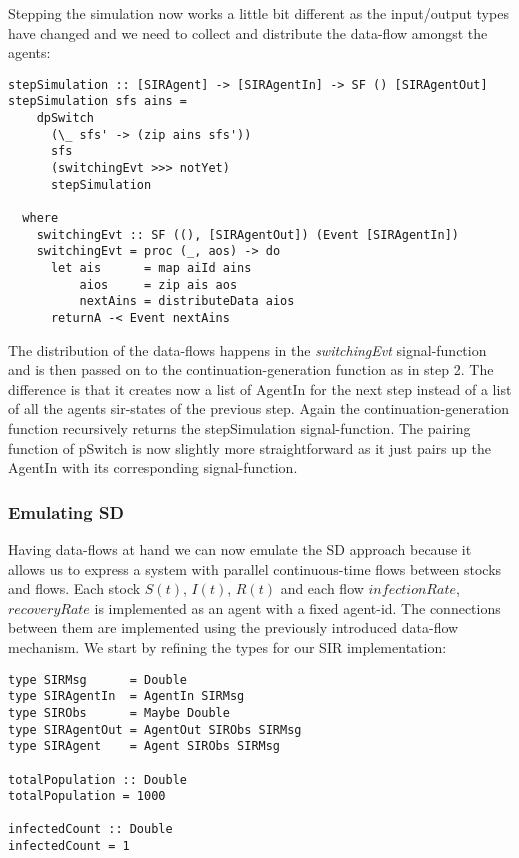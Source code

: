Stepping the simulation now works a little bit different as the input/output types have changed and we need to collect and distribute the data-flow amongst the agents:

\begin{verbatim}
stepSimulation :: [SIRAgent] -> [SIRAgentIn] -> SF () [SIRAgentOut]
stepSimulation sfs ains =
    dpSwitch
      (\_ sfs' -> (zip ains sfs'))
      sfs
      (switchingEvt >>> notYet)
      stepSimulation

  where
    switchingEvt :: SF ((), [SIRAgentOut]) (Event [SIRAgentIn])
    switchingEvt = proc (_, aos) -> do
      let ais      = map aiId ains
          aios     = zip ais aos
          nextAins = distributeData aios
      returnA -< Event nextAins
\end{verbatim}

The distribution of the data-flows happens in the \textit{switchingEvt} signal-function and is then passed on to the continuation-generation function as in step 2. The difference is that it creates now a list of AgentIn for the next step instead of a list of all the agents sir-states of the previous step. Again the continuation-generation function recursively returns the stepSimulation signal-function. The pairing function of pSwitch is now slightly more straightforward as it just pairs up the AgentIn with its corresponding signal-function.

\subsubsection{Emulating SD}
Having data-flows at hand we can now emulate the SD approach because it allows us to express a system with parallel continuous-time flows between stocks and flows. Each stock $S(t)$, $I(t)$, $R(t)$ and each flow $infectionRate$, $recoveryRate$ is implemented as an agent with a fixed agent-id. The connections between them are implemented using the previously introduced data-flow mechanism. We start by refining the types for our SIR implementation:

\begin{verbatim}
type SIRMsg      = Double
type SIRAgentIn  = AgentIn SIRMsg
type SIRObs      = Maybe Double
type SIRAgentOut = AgentOut SIRObs SIRMsg
type SIRAgent    = Agent SIRObs SIRMsg

totalPopulation :: Double
totalPopulation = 1000

infectedCount :: Double
infectedCount = 1
\end{verbatim}

